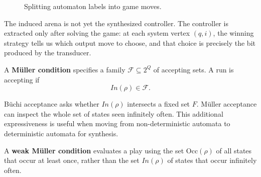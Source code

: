 \begin{figure}[ht]
\centering
{}
\caption{Splitting automaton labels into game moves.}
\label{fig:automaton-to-game-split}
\end{figure}

The induced arena is not yet the synthesized controller.  The controller
is extracted only after solving the game: at each system vertex
$(q,i)$, the winning strategy tells us which output move to choose, and
that choice is precisely the bit produced by the transducer.

\begin{definition}
\label{def:muller-condition}
A \textbf{M\"uller condition} specifies a family
$\mathcal{F}\subseteq 2^Q$ of accepting sets.  A run is accepting if
\[
  In(\rho)\in\mathcal{F}.
\]
\end{definition}

B\"uchi acceptance asks whether $In(\rho)$ intersects a fixed set
$F$.  M\"uller acceptance can inspect the whole set of states seen
infinitely often.  This additional expressiveness is useful when moving
from non-deterministic automata to deterministic automata for synthesis.

\begin{definition}
\label{def:weak-muller}
A \textbf{weak M\"uller condition} evaluates a play using the set
$\mathrm{Occ}(\rho)$ of all states that occur at least once, rather than
the set $In(\rho)$ of states that occur infinitely often.
\end{definition}

